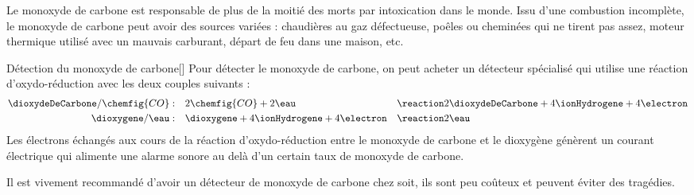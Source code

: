 \label{exo:intoxication_CO}
\medskip

Le monoxyde de carbone est responsable de plus de la moitié des morts par intoxication dans le monde.
Issu d'une combustion incomplète, le monoxyde de carbone peut avoir des sources variées : chaudières au gaz défectueuse, poêles ou cheminées qui ne tirent pas assez, moteur thermique utilisé avec un mauvais carburant, départ de feu dans une maison, etc.

\begin{doc}{Détection du monoxyde de carbone}[\label{doc:detection_monoxyde}]
    Pour détecter le monoxyde de carbone, on peut acheter un détecteur spécialisé qui utilise une réaction d'oxydo-réduction avec les deux couples suivants :
    \begin{alignat*}{2}
      \dioxydeDeCarbone/\chemfig{CO} : \quad
      & 2\chemfig{CO} + 2\eau 
      && \reaction 2\dioxydeDeCarbone + 4\ionHydrogene + 4\electron \\
      \dioxygene/\eau : \quad
      & \dioxygene + 4\ionHydrogene + 4\electron 
      && \reaction 2\eau
    \end{alignat*}
  Les électrons échangés aux cours de la réaction d'oxydo-réduction entre le monoxyde de carbone et le dioxygène génèrent un courant électrique qui alimente une alarme sonore au delà d'un certain taux de monoxyde de carbone.

  Il est vivement recommandé d'avoir un détecteur de monoxyde de carbone chez soit, ils sont peu coûteux et peuvent éviter des tragédies.
\end{doc}





